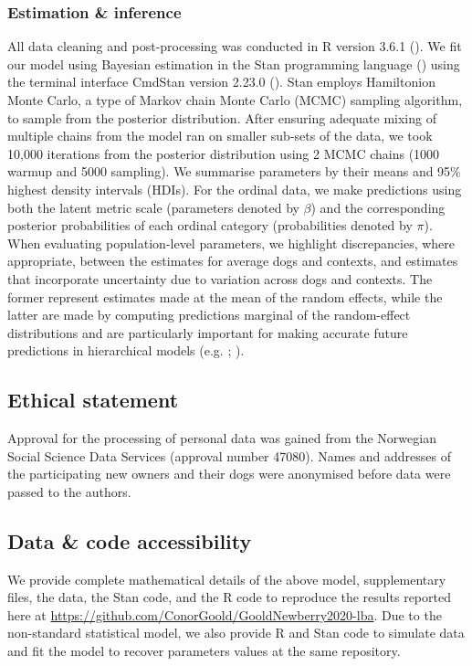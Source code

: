 \documentclass[12pt]{article}
\begin{document}
\subsubsection{Estimation \& inference}
All data cleaning and post-processing was conducted in R version 3.6.1 (\cite{rcoreteam2019}). We fit our model using Bayesian estimation in the Stan programming language (\cite{stan2018}) using the terminal interface CmdStan version 2.23.0 (\cite{cmdstan2018}). Stan employs Hamiltonion Monte Carlo, a type of Markov chain Monte Carlo (MCMC) sampling algorithm, to sample from the posterior distribution. After ensuring adequate mixing of multiple chains from the model ran on smaller sub-sets of the data, we took 10,000 iterations from the posterior distribution using 2 MCMC chains (1000 warmup and 5000 sampling). We summarise parameters by their means and 95\% highest density intervals (HDIs). For the ordinal data, we make predictions using both the latent metric scale (parameters denoted by $\beta$) and the corresponding posterior probabilities of each ordinal category (probabilities denoted by $\pi$). When evaluating population-level parameters, we highlight discrepancies, where appropriate, between the estimates for average dogs and contexts, and estimates that incorporate uncertainty due to variation across dogs and contexts. The former represent estimates made at the mean of the random effects, while the latter are made by computing predictions marginal of the random-effect distributions and are particularly important for making accurate future predictions in hierarchical models (e.g. \cite{inthout2016}; \cite{wang2019}).

\subsection{Ethical statement}
Approval for the processing of personal data was gained from the Norwegian Social Science Data Services (approval number 47080). Names and addresses of the participating new owners and their dogs were anonymised before data were passed to the authors.

\subsection{Data \& code accessibility}
We provide complete mathematical details of the above model, supplementary files, the data, the Stan code, and the R code to reproduce the results reported here at  \url{https://github.com/ConorGoold/GooldNewberry2020-lba}. Due to the non-standard statistical model, we also provide R and Stan code to simulate data and fit the model to recover parameters values at the same repository.
\end{document}
